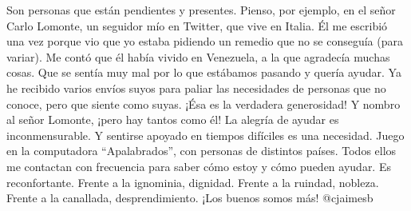 \documentclass{article}%
\begin{document}
\newline%
%
Son personas que están pendientes y presentes. Pienso, por ejemplo, en el señor Carlo Lomonte, un seguidor mío en Twitter, que vive en Italia. Él me escribió una vez porque vio que yo estaba pidiendo un remedio que no se conseguía (para variar). Me contó que él había vivido en Venezuela, a la que agradecía muchas cosas. Que se sentía muy mal por lo que estábamos pasando y quería ayudar. Ya he recibido varios envíos suyos para paliar las necesidades de personas que no conoce, pero que siente como suyas. ¡Ésa es la verdadera generosidad! Y nombro al señor Lomonte, ¡pero hay tantos como él!%
\newline%
%
La alegría de ayudar es inconmensurable. Y sentirse apoyado en tiempos difíciles es una necesidad. Juego en la computadora “Apalabrados”, con personas de distintos países. Todos ellos me contactan con frecuencia para saber cómo estoy y cómo pueden ayudar. Es reconfortante. Frente a la ignominia, dignidad. Frente a la ruindad, nobleza. Frente a la canallada, desprendimiento. ¡Los buenos somos más!%
\newline%
%
@cjaimesb%
\newline%
%
\end{document}

